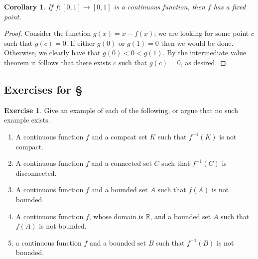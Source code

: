 \documentclass[11pt,oneside]{amsbook}
\newcommand{\R}{\mathbb R}
\theoremstyle{definition}
\newtheorem{exerc}{Exercise}[section]
\theoremstyle{plain}
\newtheorem{cor}[thm]{Corollary}
\theoremstyle{definition}
\theoremstyle{remark}
\numberwithin{equation}{section}
\numberwithin{figure}{section}
\begin{document}
\begin{cor}
  If $f\colon[0,1]\to[0,1]$ is a continuous function, then $f$ has a fixed point.
\end{cor}

\begin{proof}
  Consider the function $g(x)=x-f(x)$; we are looking for some point $c$ such that $g(c)=0$. If either $g(0)$ or $g(1)=0$ then we would be done. Otherwise, we clearly have that $g(0)<0<g(1)$. By the intermediate value theorem it follows that there exists $c$ such that $g(c)=0$, as desired.
\end{proof}

\newpage
\subsection*{Exercises for \S \thesection}

\begin{exerc}
  Give an example of each of the following, or argue that no such example exists.
  \begin{enumerate}
    \item A continuous function $f$ and a compcat set $K$ such that $f^{-1}(K)$ is not compact.
    \item A continuous function $f$ and a connected set $C$ such that $f^{-1}(C)$ is disconnected.
    \item A continuous function $f$ and a bounded set $A$ such that $f(A)$ is not bounded.
    \item A continuous function $f$, whose domain is $\R$, and a bounded set $A$ such that $f(A)$ is not bounded.
    \item a continuous function $f$ and a bounded set $B$ such that $f^{-1}(B)$ is not bounded.
  \end{enumerate}
\end{exerc}
  
\end{document}
